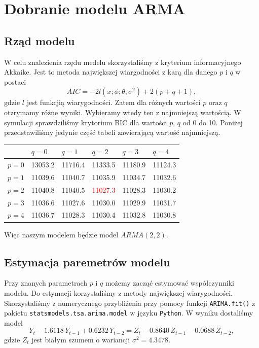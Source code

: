 \documentclass[12pt]{article}
\theoremstyle{exer}
\begin{document}
	\section{Dobranie modelu ARMA}
	\subsection{Rząd modelu}
	W celu znalezienia rzędu medelu skorzystaliśmy z kryterium informacyjnego Akkaike. Jest to metoda największej wiargodności z karą dla danego $p$ i $q$ w postaci
	\begin{equation}
		AIC=-2l(x;\phi;\theta,\sigma^2)+2(p+q+1),
	\end{equation}
	gdzie $l$ jest funkcjią wiarygodności. Zatem dla różnych wartości $p$ oraz $q$ otzrymamy różne wyniki. Wybieramy wtedy ten z najmniejszą wartością. W symulacji sprawdziliśmy krytorium BIC dla wartości $p$, $q$ od 0 do 10. Poniżej przedstawiliśmy jedynie część tabeli zawierającą wartość najmniejszą.
	\begin{table}[H]
		\centering
		\begin{tabularx}{4\textwidth/5}{|Y|Y|Y|Y|Y|Y|}
			\hline
			& $q=0$ & $q=1$ & $q=2$ & $q=3$ & $q=4$ \\\hline
			$p=0$ & 13053.2 & 11716.4 & 11333.5 & 11180.9 & 11124.3 \\\hline
			$p=1$ & 11039.6 & 11040.7 & 11035.9 & 11034.7 & 11032.6 \\\hline
			$p=2$ & 11040.8 & 11040.5 & \textcolor{red}{11027.3} & 11028.3 & 11030.2 \\\hline
			$p=3$ & 11036.6 & 11027.6 & 11030.0 & 11029.9 & 11031.7 \\\hline
			$p=4$ & 11036.7 & 11028.3 & 11030.4 & 11032.8 & 11030.8 \\\hline
		\end{tabularx}
	\end{table}
Więc naszym modelem będzie model $ARMA(2,2)$.
	\subsection{Estymacja paremetrów modelu}
	Przy znanych parametrach $p$ i $q$ możemy zacząć estymować współczynniki modelu. Do estymacji korzystaliśmy z metody największej wiarygodności. Skorzystaliśmy z numerycznego przybliżenia przy pomocy funkcji \verb*|ARIMA.fit()| z pakietu \verb*|statsmodels.tsa.arima.model| w języku \verb*|Python|. W wyniku dostaliśmy model
	\begin{equation}
		Y_t-1.6118\,Y_{t-1}+0.6232\,Y_{t-2}=Z_t-0.8640\,Z_{t-1}-0.0688\,Z_{t-2},
	\end{equation}
     gdzie $Z_t$ jest białym szumem o wariancji $\sigma^2=4.3478$.
	
\end{document}
